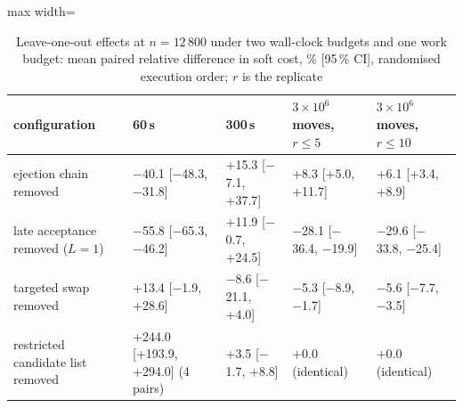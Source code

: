 \begin{table}[t]
\centering
\caption{Leave-one-out effects at $n=12\,800$ under two wall-clock budgets and one work budget: mean paired
relative difference in soft cost, \% [95\,\% CI], randomised execution order; $r$ is the replicate}
\label{tab:budget}
\footnotesize
\begin{adjustbox}{max width=\textwidth}
\begin{tabular}{@{}l l l l l@{}}
\toprule
configuration & 60\,s & 300\,s & $3\times10^6$ moves, $r\le5$ & $3\times10^6$ moves, $r\le10$ \\
\midrule
ejection chain removed & $-$40.1 [$-$48.3, $-$31.8] & +15.3 [$-$7.1, +37.7] & +8.3 [+5.0, +11.7] & +6.1 [+3.4, +8.9] \\
late acceptance removed ($L=1$) & $-$55.8 [$-$65.3, $-$46.2] & +11.9 [$-$0.7, +24.5] & $-$28.1 [$-$36.4, $-$19.9] & $-$29.6 [$-$33.8, $-$25.4] \\
targeted swap removed & +13.4 [$-$1.9, +28.6] & $-$8.6 [$-$21.1, +4.0] & $-$5.3 [$-$8.9, $-$1.7] & $-$5.6 [$-$7.7, $-$3.5] \\
restricted candidate list removed & +244.0 [+193.9, +294.0] (4 pairs) & +3.5 [$-$1.7, +8.8] & +0.0 (identical) & +0.0 (identical) \\
\bottomrule
\end{tabular}
\end{adjustbox}
\end{table}
